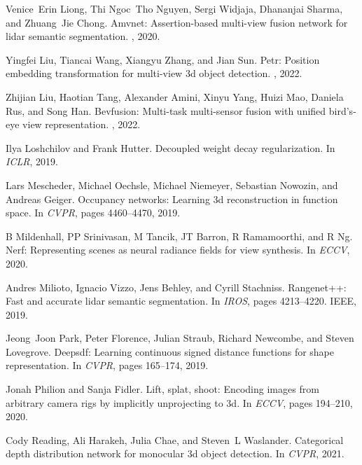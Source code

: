 \documentclass[10pt,twocolumn,letterpaper]{article}
\begin{document}
{\begin{thebibliography}{10}
Venice~Erin Liong, Thi Ngoc~Tho Nguyen, Sergi Widjaja, Dhananjai Sharma, and
  Zhuang~Jie Chong.
\newblock Amvnet: Assertion-based multi-view fusion network for lidar semantic
  segmentation.
, 2020.

Yingfei Liu, Tiancai Wang, Xiangyu Zhang, and Jian Sun.
\newblock Petr: Position embedding transformation for multi-view 3d object
  detection.
, 2022.

Zhijian Liu, Haotian Tang, Alexander Amini, Xinyu Yang, Huizi Mao, Daniela Rus,
  and Song Han.
\newblock Bevfusion: Multi-task multi-sensor fusion with unified bird's-eye
  view representation.
, 2022.

Ilya Loshchilov and Frank Hutter.
\newblock Decoupled weight decay regularization.
\newblock In {\em ICLR}, 2019.

Lars Mescheder, Michael Oechsle, Michael Niemeyer, Sebastian Nowozin, and
  Andreas Geiger.
\newblock Occupancy networks: Learning 3d reconstruction in function space.
\newblock In {\em CVPR}, pages 4460--4470, 2019.

B Mildenhall, PP Srinivasan, M Tancik, JT Barron, R Ramamoorthi, and R Ng.
\newblock Nerf: Representing scenes as neural radiance fields for view
  synthesis.
\newblock In {\em ECCV}, 2020.

Andres Milioto, Ignacio Vizzo, Jens Behley, and Cyrill Stachniss.
\newblock Rangenet++: Fast and accurate lidar semantic segmentation.
\newblock In {\em IROS}, pages 4213--4220. IEEE, 2019.

Jeong~Joon Park, Peter Florence, Julian Straub, Richard Newcombe, and Steven
  Lovegrove.
\newblock Deepsdf: Learning continuous signed distance functions for shape
  representation.
\newblock In {\em CVPR}, pages 165--174, 2019.

Jonah Philion and Sanja Fidler.
\newblock Lift, splat, shoot: Encoding images from arbitrary camera rigs by
  implicitly unprojecting to 3d.
\newblock In {\em ECCV}, pages 194--210, 2020.

Cody Reading, Ali Harakeh, Julia Chae, and Steven~L Waslander.
\newblock Categorical depth distribution network for monocular 3d object
  detection.
\newblock In {\em CVPR}, 2021.


\end{thebibliography}}
\end{document}
